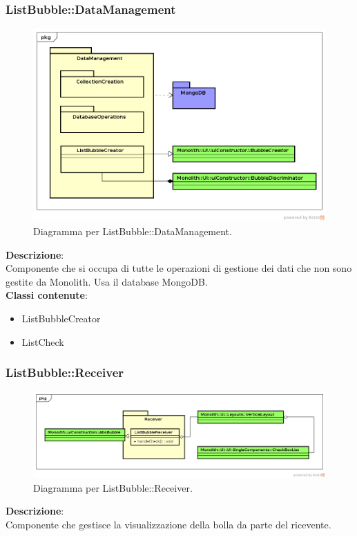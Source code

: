 \subsubsection{ListBubble::DataManagement}
   \FloatBarrier
   \begin{figure}[ht]
   \centering
\includegraphics[width=\textwidth,keepaspectratio]{img/listchecklistDatabase}
   \caption{Diagramma per ListBubble::DataManagement.}
\end{figure}
\FloatBarrier
\textbf{Descrizione}:\\
 Componente che si occupa di tutte le operazioni di gestione dei dati che non sono gestite da Monolith. Usa il database MongoDB. 
\\ \textbf{Classi contenute}:\\
\begin{itemize}
\item ListBubbleCreator
\item ListCheck
\end{itemize}


\clearpage

\subsubsection{ListBubble::Receiver}
   \FloatBarrier
   \begin{figure}[ht]
   \centering
\includegraphics[width=\textwidth,keepaspectratio]{img/listchecklistReceiver}
   \caption{Diagramma per ListBubble::Receiver.}
\end{figure}
\FloatBarrier
\textbf{Descrizione}:\\
 Componente che gestisce la visualizzazione della bolla da parte del ricevente. 


